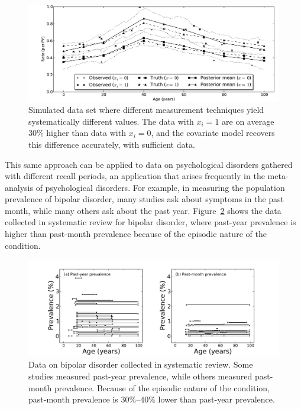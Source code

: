 \begin{figure}[h]
\begin{center}
\includegraphics[width=\textwidth]{cov_fe.pdf}
\caption{Simulated data set where different measurement techniques
  yield systematically different values. The data with $x_i=1$ are on
  average 30\% higher than data with $x_i=0$, and the covariate model
  recovers this difference accurately, with sufficient data.}
\label{cov-sim}
\end{center}
\end{figure}

This same approach can be applied to data on psychological disorders
gathered with different recall periods, an application that arises
frequently in the meta-analysis of psychological disorders.  For
example, in measuring the population prevalence of bipolar disorder,
many studies ask about symptoms in the past month,
while many others ask about the past year.
Figure~\ref{bipolar-data-cv} shows the data collected in systematic
review for bipolar disorder, where past-year prevalence is higher than
past-month prevalence because of the episodic nature of the
condition.

\begin{figure}[h]
\begin{center}
\includegraphics[width=\textwidth]{bipolar-data-by-cv.pdf}
\caption{Data on bipolar disorder collected in systematic review.
  Some studies measured past-year prevalence, while others measured
  past-month prevalence.  Because of the episodic nature of the
  condition, past-month prevalence is $30\%$--$40\%$ lower than past-year prevalence.}
\label{bipolar-data-cv}
\end{center}
\end{figure}


